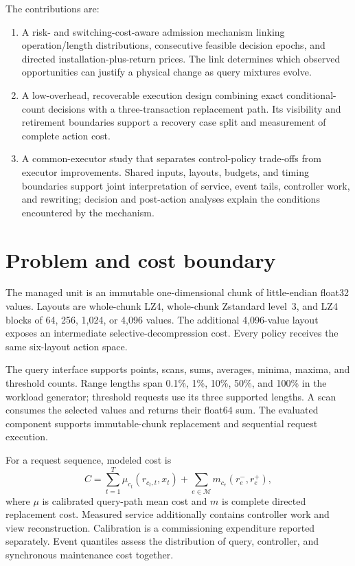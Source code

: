 The contributions are:
\begin{enumerate}
\item A risk- and switching-cost-aware admission mechanism linking operation/length distributions, consecutive feasible decision epochs, and directed installation-plus-return prices. The link determines which observed opportunities can justify a physical change as query mixtures evolve.
\item A low-overhead, recoverable execution design combining exact conditional-count decisions with a three-transaction replacement path. Its visibility and retirement boundaries support a recovery case split and measurement of complete action cost.
\item A common-executor study that separates control-policy trade-offs from executor improvements. Shared inputs, layouts, budgets, and timing boundaries support joint interpretation of service, event tails, controller work, and rewriting; decision and post-action analyses explain the conditions encountered by the mechanism.
\end{enumerate}

\section{Problem and cost boundary}
\label{sec:problem}
The managed unit is an immutable one-dimensional chunk of little-endian float32 values. Layouts are whole-chunk LZ4, whole-chunk Zstandard level~3, and LZ4 blocks of 64, 256, 1,024, or 4,096 values. The additional 4,096-value layout exposes an intermediate selective-decompression cost. Every policy receives the same six-layout action space.

The query interface supports points, scans, sums, averages, minima, maxima, and threshold counts. Range lengths span 0.1\%, 1\%, 10\%, 50\%, and 100\% in the workload generator; threshold requests use its three supported lengths. A scan consumes the selected values and returns their float64 sum. The evaluated component supports immutable-chunk replacement and sequential request execution.

For a request sequence, modeled cost is
\begin{equation}
C=\sum_{t=1}^{T}\mu_{c_t}(r_{c_t,t},x_t)+\sum_{e\in\mathcal M}m_{c_e}(r_e^-,r_e^+),
\label{eq:cost}
\end{equation}
where $\mu$ is calibrated query-path mean cost and $m$ is complete directed replacement cost. Measured service additionally contains controller work and view reconstruction. Calibration is a commissioning expenditure reported separately. Event quantiles assess the distribution of query, controller, and synchronous maintenance cost together.
